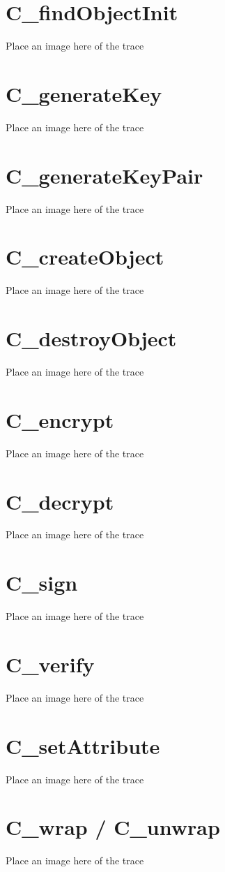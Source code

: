 \documentclass[bsc,frontabs,twoside,singlespacing,parskip,deptreport]{infthesis}     %
\begin{document}
\section{C\_findObjectInit}
Place an image here of the trace
\section{C\_generateKey}
Place an image here of the trace
\section{C\_generateKeyPair}
Place an image here of the trace
\section{C\_createObject}
Place an image here of the trace
\section{C\_destroyObject}
Place an image here of the trace
\section{C\_encrypt}
Place an image here of the trace
\section{C\_decrypt}
Place an image here of the trace
\section{C\_sign}
Place an image here of the trace
\section{C\_verify}
Place an image here of the trace
\section{C\_setAttribute}
Place an image here of the trace
\section{C\_wrap / C\_unwrap}
Place an image here of the trace




\end{document}
